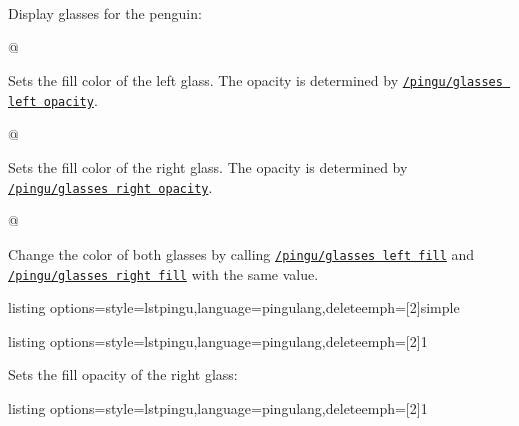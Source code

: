 \documentclass[parskip=half,english,numbers=noenddot,footnotes=nomultiple,oneside,fontsize=10pt,DIV=15,headinclude]{scrartcl}
\makeatletter
\def\pingu@listing@text{}
\def\lpingu#1{\begingroup\def\pingu@listing@text{#1}\lstinline[style=lstpingu,breakatwhitespace]'#1'\endgroup}
\newcommand*\keyref[2][/pingu/]{\hyperref[pk:#1#2]{\lpingu{#1#2}}}
\makeatother
\begin{document}
{{
Display glasses for the penguin:
\begin{tcblisting}{@}
\begin{tikzpicture}
	\pingu[glasses=green]
\end{tikzpicture}
\end{tcblisting}
\endshowkeyexplain

	Sets the fill color of the left glass. The opacity is determined by \keyref{glasses left opacity}.
\begin{tcblisting}{@}
\begin{tikzpicture}
	\pingu[glasses,
	       glasses left fill=green]
\end{tikzpicture}
\end{tcblisting}
\endsubkeyexplain

	Sets the fill color of the right glass. The opacity is determined by \keyref{glasses right opacity}.
\begin{tcblisting}{@}
\begin{tikzpicture}
	\pingu[glasses,
	       glasses right fill=green]
\end{tikzpicture}
\end{tcblisting}
\endsubkeyexplain

	Change the color of both glasses by calling \keyref{glasses left fill} and \keyref{glasses right fill} with the same value.
\begin{tcblisting}{listing options={style=lstpingu,language=pingulang,deleteemph={[2]{simple}}}}
\begin{tikzpicture}
	\pingu[glasses, glasses fill=green]
\end{tikzpicture}
\end{tcblisting}
\endsubkeyexplain

\begin{tcblisting}{listing options={style=lstpingu,language=pingulang,deleteemph={[2]{1}}}}
\begin{tikzpicture}
	\pingu[glasses,
	       glasses left fill=green,
				 glasses left opacity=1]
\end{tikzpicture}
\end{tcblisting}
\endsubkeyexplain

	Sets the fill opacity of the right glass:
\begin{tcblisting}{listing options={style=lstpingu,language=pingulang,deleteemph={[2]{1}}}}
\begin{tikzpicture}
	\pingu[glasses,
	       glasses right fill=green,
				 glasses right opacity=1]
\end{tikzpicture}
\end{tcblisting}
\endsubkeyexplain

}}
\end{document}
